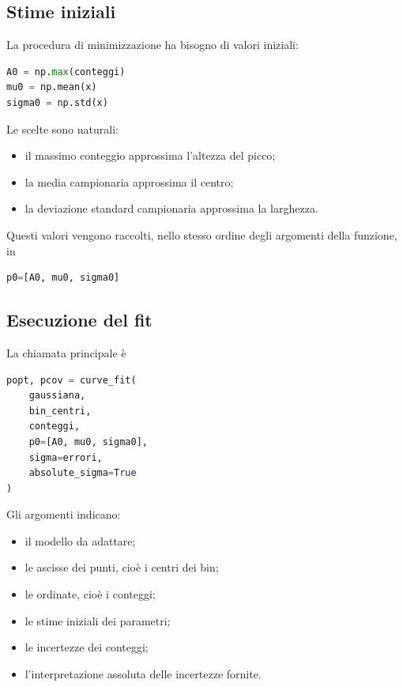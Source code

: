 \subsection{Stime iniziali}

La procedura di minimizzazione ha bisogno di valori iniziali:

\begin{lstlisting}[language=Python]
A0 = np.max(conteggi)
mu0 = np.mean(x)
sigma0 = np.std(x)
\end{lstlisting}

Le scelte sono naturali:

\begin{itemize}
    \item il massimo conteggio approssima l'altezza del picco;
    \item la media campionaria approssima il centro;
    \item la deviazione standard campionaria approssima la larghezza.
\end{itemize}

Questi valori vengono raccolti, nello stesso ordine degli argomenti della
funzione, in

\begin{lstlisting}[language=Python]
p0=[A0, mu0, sigma0]
\end{lstlisting}

\subsection{Esecuzione del fit}

La chiamata principale è

\begin{lstlisting}[language=Python]
popt, pcov = curve_fit(
    gaussiana,
    bin_centri,
    conteggi,
    p0=[A0, mu0, sigma0],
    sigma=errori,
    absolute_sigma=True
)
\end{lstlisting}

Gli argomenti indicano:

\begin{itemize}
    \item il modello da adattare;
    \item le ascisse dei punti, cioè i centri dei bin;
    \item le ordinate, cioè i conteggi;
    \item le stime iniziali dei parametri;
    \item le incertezze dei conteggi;
    \item l'interpretazione assoluta delle incertezze fornite.
\end{itemize}

